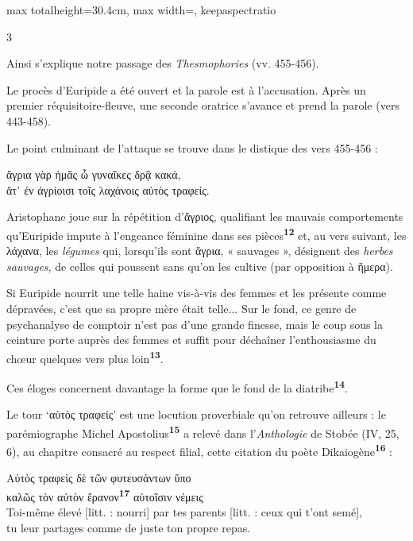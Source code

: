 \documentclass[11pt,twoside]{book}
\newcommand{\italique}[1]{\textit{#1}}
\newcommand{\citComm}[1]{\begin{quoting}[vskip=0.4pt,leftmargin=0.7em,rightmargin=0.2em]#1\end{quoting}}
\newcommand{\marqueur}[1]{\textsuperscript{\color{rubricRed}\textbf{#1}}}
\begin{document}
\begin{adjustbox}{max totalheight=30.4cm, max width=\textwidth, keepaspectratio}
\begin{minipage}{\textwidth}
{\begin{multicols}{3}
\par\vspace{1.5pt}
\noindent Ainsi s'explique notre passage des \italique{Thesmophories} (vv. 455-456).
\par\vspace{1.5pt}
\noindent Le procès d'Euripide a été ouvert et la parole est à l'accusation. Après un premier réquisitoire-fleuve, une seconde oratrice s'avance et prend la parole (vers 443-458).
\par\vspace{1.5pt}
\noindent Le point culminant de l'attaque se trouve dans le distique des vers 455-456 :
\citComm{ἄγρια γὰρ ἡμᾶς ὦ γυναῖκες δρᾷ κακά,\\
ἅτ᾽ ἐν ἀγρίοισι τοῖς λαχάνοις αὐτὸς τραφείς.}
\par\vspace{1.5pt}
\noindent Aristophane joue sur la répétition d'ἄγριος, qualifiant les mauvais comportements qu'Euripide impute à l'engeance féminine dans ses pièces\marqueur{12} et, au vers suivant, les λάχανα, les \italique{légumes} qui, lorsqu'ils sont ἄγρια, « sauvages », désignent des \italique{herbes sauvages}, de celles qui poussent sans qu'on les cultive (par opposition à ἥμερα).
\par\vspace{1.5pt}
\noindent Si Euripide nourrit une telle haine vis-à-vis des femmes et les présente comme dépravées, c'est que sa propre mère était telle... Sur le fond, ce genre de psychanalyse de comptoir n'est pas d'une grande finesse, mais le coup sous la ceinture porte auprès des femmes et suffit pour déchaîner l'enthousiasme du chœur quelques vers plus loin\marqueur{13}.
\par\vspace{1.5pt}
\noindent Ces éloges concernent davantage la forme que le fond de la diatribe\marqueur{14}.
\par\vspace{1.5pt}
\noindent Le tour `αὐτὸς τραφείς' est une locution proverbiale qu'on retrouve ailleurs : le parémiographe Michel Apostolius\marqueur{15} a relevé dans l'\italique{Anthologie} de Stobée (IV, 25, 6), au chapitre consacré au respect filial, cette citation du poète Dikaiogène\marqueur{16} :
\citComm{Αὐτὸς τραφεὶς δὲ τῶν φυτευσάντων ὕπο\\
καλῶς τὸν αὐτὸν ἔρανον\marqueur{17} αὐτοῖσιν νέμεις\\
Toi-même élevé [litt. : nourri] par tes parents [litt. : ceux qui t'ont semé],\\
tu leur partages comme de juste ton propre repas.}

\end{multicols}}
\end{minipage}
\end{adjustbox}
\end{document}
